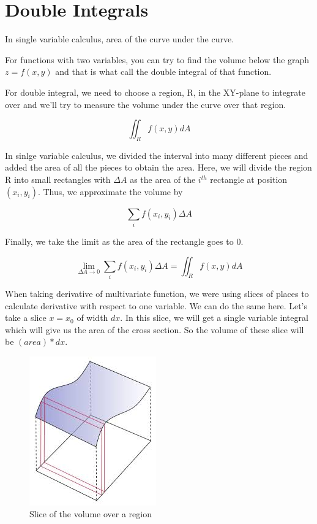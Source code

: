

\chapter{Double Integrals}

\bigbreak

In single variable calculus,  area of the curve under the curve.

For functions with two variables, you can try to find the volume below the graph $z = f(x, y)$ and that is what call the double integral of that function.

For double integral, we need to choose a region, R, in the XY-plane to integrate over and we'll try to measure the volume under the curve over that region.

$$ \iint_{R} f(x, y) dA $$

In sinlge variable calculus, we divided the interval into many different pieces and added the area of all the pieces to obtain the area.
Here, we will divide the region R into small rectangles with $\Delta A$ as the area of the $i^{th}$ rectangle at position $(x_i, y_i)$. Thus, we approximate the volume by

$$  \sum_i f(x_i, y_i) \Delta A $$

Finally, we take the limit as the area of the rectangle goes to $0$.

$$ \lim_{\Delta A \to 0} \sum_i f(x_i, y_i) \Delta A = \iint_R f(x, y) dA $$

When taking derivative of multivariate function, we were using slices of places to calculate derivative with respect to one variable.
We can do the same here. Let's take a slice $x = x_0$ of width $dx$. 
In this slice, we will get a single variable integral which will give us the area of the cross section. 
So the volume of these slice will be $(area) * dx$. 

\begin{figure}[ht!]
    \centering
    \includegraphics[scale=0.7]{./images/lecture_11_figure_1.jpeg}
    \caption{Slice of the volume over a region}
\end{figure}

